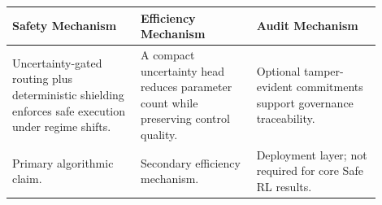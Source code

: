 \footnotesize
\setlength{\tabcolsep}{4pt}
\begin{tabular}{p{0.31\linewidth}p{0.29\linewidth}p{0.30\linewidth}}
\toprule
\textbf{Safety Mechanism} & \textbf{Efficiency Mechanism} & \textbf{Audit Mechanism} \\
\midrule
Uncertainty-gated routing plus deterministic shielding enforces safe execution under regime shifts. & A compact uncertainty head reduces parameter count while preserving control quality. & Optional tamper-evident commitments support governance traceability. \\
\midrule
Primary algorithmic claim. & Secondary efficiency mechanism. & Deployment layer; not required for core Safe RL results. \\
\bottomrule
\end{tabular}

